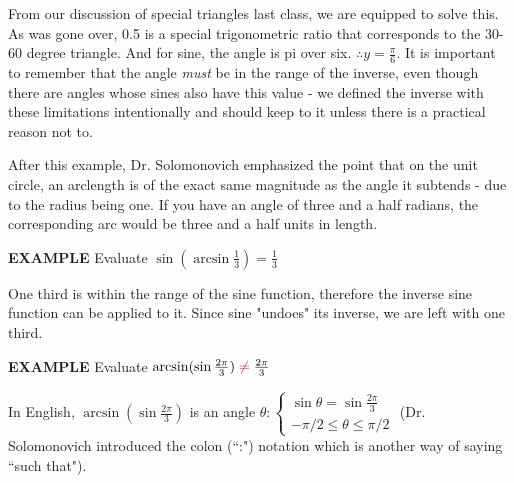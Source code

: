 \documentclass{article}
\begin{document}
From our discussion of special triangles last class, we are equipped to solve this. As was gone over, 0.5 is a special trigonometric ratio that corresponds to the 30-60 degree triangle. And for sine, the angle is pi over six. $\therefore y=\frac{\pi}{6}$. It is important to remember that the angle \textit{must} be in the range of the inverse, even though there are angles whose sines also have this value - we defined the inverse with these limitations intentionally and should keep to it unless there is a practical reason not to.

\vspace{10pt}

After this example, Dr. Solomonovich emphasized the point that on the unit circle, an arclength is of the exact same magnitude as the angle it subtends - due to the radius being one. If you have an angle of three and a half radians, the corresponding arc would be three and a half units in length.

\vspace{10pt}

{\bf{}EXAMPLE} Evaluate $\sin(\arcsin\frac{1}{3})=\frac{1}{3}$

\vspace{10pt}

One third is within the range of the sine function, therefore the inverse sine function can be applied to it. Since sine "undoes" its inverse, we are left with one third.

\vspace{10pt}

{\bf{}EXAMPLE} Evaluate $\arcsin(\sin\frac{2\pi}{3})\color{red}\neq\color{black}\frac{2\pi}{3}$

\vspace{10pt}

In English, $\arcsin(\sin\frac{2\pi}{3})$ is an angle $\theta:\left\{\begin{array}{c}\sin\theta=\sin\frac{2\pi}{3}\\-\pi/2\leq\theta\leq\pi/2\end{array}\right.$ (Dr. Solomonovich introduced the colon (``:") notation which is another way of saying  ``such that").

\begin{center}
\end{center}
\end{document}

